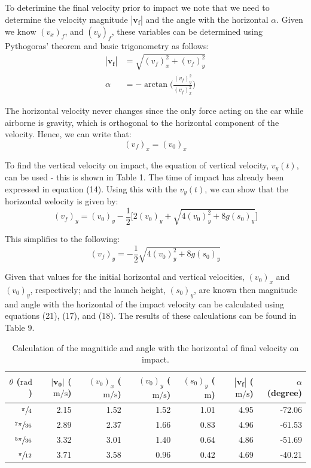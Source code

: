 \documentclass[a4paper]{article}
\begin{document}
To deterimine the final velocity prior to impact we note that we need to determine the velocity magnitude $|\boldsymbol{v_f}|$ and the angle with the horizontal $\alpha$. Given we know $(v_x)_f$, and $(v_y)_f$, these variables can be determined using Pythogoras' theorem and basic trigonometry as follows:
\begin{align}
|\boldsymbol{v_f}| &= \sqrt{(v_f)_x^2 + (v_f)_y^2}\\
\alpha &= -\arctan\bigg(\frac{(v_f)_y^2}{(v_f)_x^2}\bigg)
\end{align} 

The horizontal velocity never changes since the only force acting on the car while airborne is gravity, which is orthogonal to the horizontal component of the velocity. Hence, we can write that:
\begin{equation}
(v_f)_x = (v_0)_x
\end{equation}

To find the vertical velocity on impact, the equation of vertical velocity, $v_y(t)$, can be used - this is shown in Table 1. The time of impact has already been expressed in equation (14). Using this with the $v_y(t)$, we can show that the horizontal welocity is given by:
\begin{equation}
(v_f)_y = (v_0)_y - \frac{1}{2} \bigg[2(v_0)_y + \sqrt{4(v_0)_y^2 + 8g(s_0)_y}\bigg]
\end{equation}

This simplifies to the following:
\begin{equation}
(v_f)_y = - \frac{1}{2} \sqrt{4(v_0)_y^2 + 8g(s_0)_y}
\end{equation}

Given that values for the initial horizontal and vertical velocities, $(v_0)_x$ and $(v_0)_y$, respectively; and the launch height, $(s_0)_y$, are known then magnitude and angle with the horizontal of the impact velocity can be calculated using equations (21), (17), and (18). The results of these calculations can be found in Table 9.

\begin{table}[h]
	\centering
	\caption{Calculation of the magnitide and angle with the horizontal of final velocity on impact.}
	\begin{tabular}{rrrrrrr}
		\toprule
		$\theta$ ($\si{\radian}$) & $|\boldsymbol{v_0}|$ ($\si{\meter\per\second}$) & $(v_0)_x$ ($\si{\meter\per\second}$) & $(v_0)_y$ ($\si{\meter\per\second}$) & $(s_0)_y$ ($\si{\meter}$) & $|\boldsymbol{v_f}|$ ($\si{\meter\per\second}$) & $\alpha$ (degree)\\
		\midrule
		$\sfrac{\pi}{4}$ & 2.15 & 1.52 & 1.52 & 1.01 & 4.95 & -72.06 \\
		$\sfrac{7\pi}{36}$ & 2.89 & 2.37 & 1.66 & 0.83 & 4.96 & -61.53 \\
		$\sfrac{5\pi}{36}$ & 3.32 & 3.01 & 1.40 & 0.64 & 4.86 & -51.69 \\
		$\sfrac{\pi}{12}$ & 3.71 & 3.58 & 0.96 & 0.42 & 4.69 & -40.21 \\
		\bottomrule
	\end{tabular}
\end{table}
\end{document}
